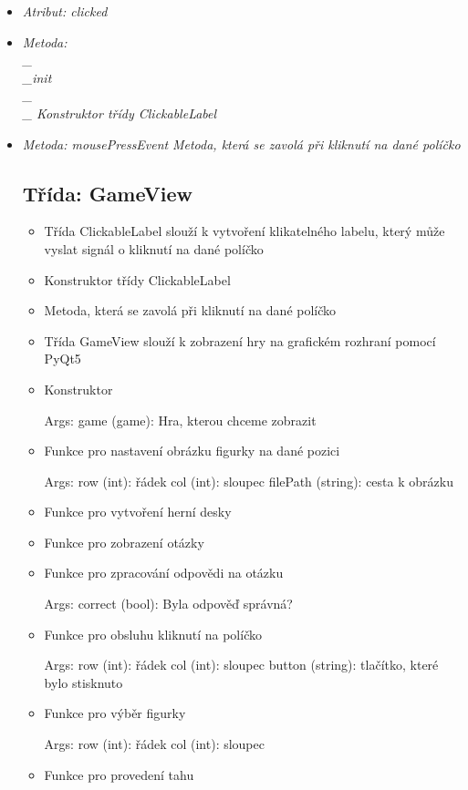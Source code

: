 \documentclass{article}
\begin{document}
\begin{itemize}
\begin{itemize}
{Args:
    message (string): Výsledek hry}
\item{Funkce pro výběr figurky, na kterou se má pesák změnit
        }
\end{itemize}
\item \textit{Atribut: clicked}
\item \textit{Metoda: \\_\\_init\\_\\_}
\textit{Konstruktor třídy ClickableLabel 
        }
\item \textit{Metoda: mousePressEvent}
\textit{Metoda, která se zavolá při kliknutí na dané políčko
        }
 \subsection*{Třída: GameView}
\begin{itemize}
\item{Třída ClickableLabel slouží k vytvoření klikatelného labelu, který může vyslat signál o kliknutí na dané políčko
    }
\item{Konstruktor třídy ClickableLabel 
        }
\item{Metoda, která se zavolá při kliknutí na dané políčko
        }
\item{Třída GameView slouží k zobrazení hry na grafickém rozhraní pomocí PyQt5
    }
\item{Konstruktor

Args:
    game (game): Hra, kterou chceme zobrazit}
\item{Funkce pro nastavení obrázku figurky na dané pozici

Args:
    row (int): řádek
    col (int): sloupec
    filePath (string): cesta k obrázku}
\item{Funkce pro vytvoření herní desky
        }
\item{Funkce pro zobrazení otázky
        }
\item{Funkce pro zpracování odpovědi na otázku

Args:
    correct (bool): Byla odpověď správná?}
\item{Funkce pro obsluhu kliknutí na políčko

Args:
    row (int): řádek
    col (int): sloupec
    button (string): tlačítko, které bylo stisknuto}
\item{Funkce pro výběr figurky

Args:
    row (int): řádek
    col (int): sloupec}
\item{Funkce pro provedení tahu

}
\end{itemize}
\end{itemize}
\end{document}
